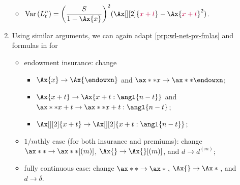\begin{enumerate}
\begin{itemize}
\item \(\displaystyle \vari{L_t^n}=\qty(\frac{S}{1-\Ax{x}})^{2}(\Ax[][2]{{\color{purple}x+t}}-\Ax{{\color{purple}x+t}}^2)\).
\end{itemize}


\item Using similar arguments, we can again adapt \cref{prp:wl-net-pv-fmlas} and
formulas in  for
\begin{itemize}
\item endowment insurance: change 
\begin{itemize}
\item \(\Ax{x}\to\Ax{\endowxn}\) and \(\ax**{x}\to\ax**{\endowxn}\);

\item \(\Ax{x+t}\to\Ax{x+t:\angl{n-t}}\) and \(\ax**{x+t}\to\ax**{x+t:\angl{n-t}}\);

\item \(\Ax[][2]{x+t}\to \Ax[][2]{x+t:\angl{n-t}}\);
\end{itemize}

\item \(1/m\)thly case (for both insurance and premiums): change
\(\ax**{}\to\ax**{}[(m)]\), \(\Ax{}\to\Ax{}[(m)]\), and \(d\to d^{(m)}\);
\item fully continuous case: change
\(\ax**{}\to\ax*{}\), \(\Ax{}\to\Ax*{}\), and \(d\to \delta\).
\end{itemize}
\end{enumerate}
